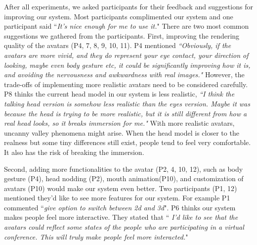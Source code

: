 After all experiments, we asked participants for their feedback and suggestions for improving our system. Most participants complimented our system and one participant said ``\textit{It's nice enough for me to use it.}" There are two most common suggestions we gathered from the participants. First, improving the rendering quality of the avatars (P4, 7, 8, 9, 10, 11). P4 mentioned \textit{``Obviously, if the avatars are more vivid, and they do represent your eye contact, your direction of looking, maybe even body gesture etc, it could be significantly improving how it is, and avoiding the nervousness and awkwardness with real images." }However, the trade-offs of implementing more realistic avatars need to be considered carefully. P8 thinks the current head model in our system is less realistic, \textit{ ``I think the talking head version is somehow less realistic than the eyes version. Maybe it was because the head is trying to be more realistic, but it is still different from how a real head looks, so it breaks immersion for me."} With more realistic avatars, uncanny valley phenomena might arise. When the head model is closer to the realness but some tiny differences still exist, people tend to feel very comfortable. It also has the risk of breaking the immersion. 

Second, adding more functionalities to the avatar (P2, 4, 10, 12), such as body gesture (P4), head nodding (P2), mouth animation(P10), and customization of avatars (P10) would make our system even better. Two participants (P1, 12) mentioned they’d like to see more features for our system. For example P1 commented ``\textit{give option to switch between 2d and 3d}". P6 thinks our system makes people feel more interactive. They stated that `` \textit{I'd like to see that the avatars could reflect some states of the people who are participating in a virtual conference. This will truly make people feel more interacted.}" 

